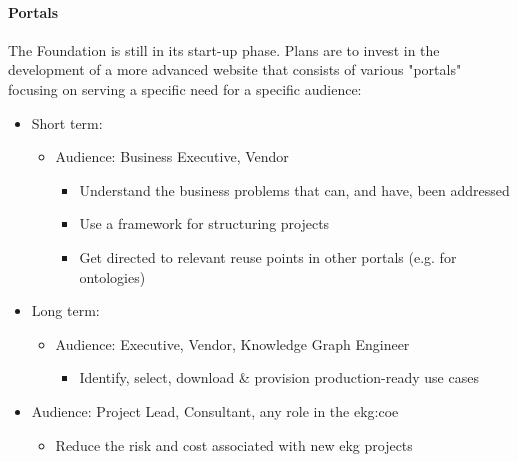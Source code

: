 \paragraph{Portals}

The Foundation is still in its start-up phase.
Plans are to invest in the development of a more advanced website that consists of various "portals" focusing
on serving a specific need for a specific audience:

\begin{description}[font=\bfseries,nosep,leftmargin=!,labelwidth=\widthof{\bfseries Member Directory \& Services}]
    \item[Use Cases]
        \begin{itemize}
            \item Short term:
            \begin{itemize}
                \item Audience: Business Executive, Vendor
                    \begin{itemize}
                        \item Understand the business problems that can, and have, been addressed
                        \item Use a framework for structuring projects
                        \item Get directed to relevant reuse points in other portals (e.g. for ontologies)
                    \end{itemize}
            \end{itemize}
            \item Long term:
            \begin{itemize}
                \item Audience: Executive, Vendor, Knowledge Graph Engineer
                    \begin{itemize}
                        \item Identify, select, download \& provision production-ready use cases
                    \end{itemize}
            \end{itemize}
        \end{itemize}
    \item[Best Practices]
        \begin{itemize}
            \item Audience: Project Lead, Consultant, any role in the \gls{ekg:coe}
            \begin{itemize}
                \item Reduce the risk and cost associated with new \gls{ekg} projects

\end{itemize}
\end{itemize}
\end{description}
